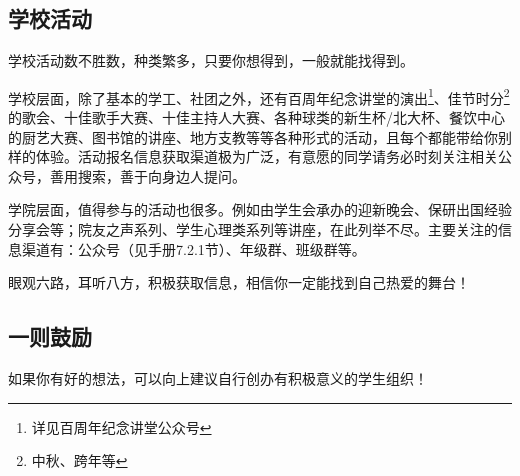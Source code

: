 \subsection{学校活动}
学校活动数不胜数，种类繁多，只要你想得到，一般就能找得到。

\vspace{10pt}

学校层面，除了基本的学工、社团之外，还有百周年纪念讲堂的演出\footnote{详见百周年纪念讲堂公众号}、佳节时分\footnote{中秋、跨年等}的歌会、十佳歌手大赛、十佳主持人大赛、各种球类的新生杯/北大杯、餐饮中心的厨艺大赛、图书馆的讲座、地方支教等等各种形式的活动，且每个都能带给你别样的体验。活动报名信息获取渠道极为广泛，有意愿的同学请务必时刻关注相关公众号，善用搜索，善于向身边人提问。

\vspace{10pt}

学院层面，值得参与的活动也很多。例如由学生会承办的迎新晚会、保研出国经验分享会等；院友之声系列、学生心理类系列等讲座，在此列举不尽。主要关注的信息渠道有：公众号（见手册7.2.1节）、年级群、班级群等。

\vspace{10pt}

眼观六路，耳听八方，积极获取信息，相信你一定能找到自己热爱的舞台！

\subsection{一则鼓励}
如果你有好的想法，可以向上建议自行创办有积极意义的学生组织！
